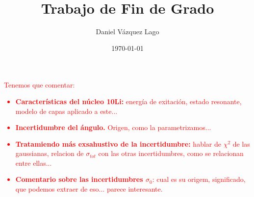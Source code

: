 \documentclass[12pt]{article}
\title{\textbf{\Huge Trabajo de Fin de Grado}}
\author{\Large Daniel Vázquez Lago}
\date{\today}
\begin{document}
\maketitle
\newpage
\tableofcontents
\newpage

\setlength{\parskip}{2.2mm} %


\begin{Anotacion}
\textcolor{red}{Tenemos que comentar: 
\begin{itemize}
    \item \textbf{Características del núcleo 10Li:} energía de exitación, estado resonante, modelo de capas aplicado a este...
    \item \textbf{Incertidumbre del ángulo.} Origen, como la parametrizamos...
    \item \textbf{Tratamiendo más exsahustivo de la incertidumbre:} hablar de $\chi^2$ de las gaussianas, relacion de $\sigma_{tot}$ con las otras incertidumbres, como se relacionan entre ellas...
    \item \textbf{Comentario sobre las incertidumbres $\sigma_0$}: cual es su origem, significado, que podemos extraer de eso... parece interesante.
\end{itemize}}
\end{Anotacion}










\newpage
%

\printbibliography
{}
			
\end{document}
